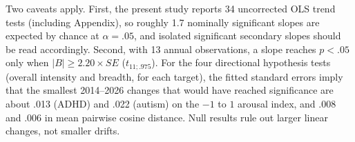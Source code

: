 Two caveats apply. First, the present study reports 34 uncorrected OLS trend tests (including Appendix), so roughly 1.7 nominally significant slopes are expected by chance at $\alpha = .05$, and isolated significant secondary slopes should be read accordingly. Second, with 13 annual observations, a slope reaches $p < .05$ only when $|B| \geq 2.20 \times \mathit{SE}$ ($t_{11;.975}$). For the four directional hypothesis tests (overall intensity and breadth, for each target), the fitted standard errors imply that the smallest 2014--2026 changes that would have reached significance are about .013 (ADHD) and .022 (autism) on the $-1$ to $1$ arousal index, and .008 and .006 in mean pairwise cosine distance. Null results rule out larger linear changes, not smaller drifts.
